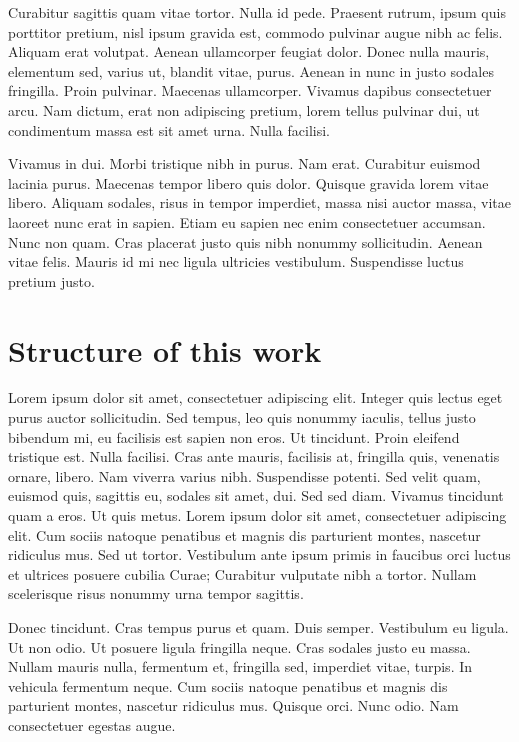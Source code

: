 Curabitur sagittis quam vitae tortor. Nulla id pede. Praesent rutrum, ipsum quis porttitor pretium, nisl ipsum gravida est, commodo pulvinar augue nibh ac felis. Aliquam erat volutpat. Aenean ullamcorper feugiat dolor. Donec nulla mauris, elementum sed, varius ut, blandit vitae, purus. Aenean in nunc in justo sodales fringilla. Proin pulvinar. Maecenas ullamcorper. Vivamus dapibus consectetuer arcu. Nam dictum, erat non adipiscing pretium, lorem tellus pulvinar dui, ut condimentum massa est sit amet urna. Nulla facilisi.

Vivamus in dui. Morbi tristique nibh in purus. Nam erat. Curabitur euismod lacinia purus. Maecenas tempor libero quis dolor. Quisque gravida lorem vitae libero. Aliquam sodales, risus in tempor imperdiet, massa nisi auctor massa, vitae laoreet nunc erat in sapien. Etiam eu sapien nec enim consectetuer accumsan. Nunc non quam. Cras placerat justo quis nibh nonummy sollicitudin. Aenean vitae felis. Mauris id mi nec ligula ultricies vestibulum. Suspendisse luctus pretium justo. 

\section{Structure of this work} 
Lorem ipsum dolor sit amet, consectetuer adipiscing elit. Integer quis lectus eget purus auctor sollicitudin. Sed tempus, leo quis nonummy iaculis, tellus justo bibendum mi, eu facilisis est sapien non eros. Ut tincidunt. Proin eleifend tristique est. Nulla facilisi. Cras ante mauris, facilisis at, fringilla quis, venenatis ornare, libero. Nam viverra varius nibh. Suspendisse potenti. Sed velit quam, euismod quis, sagittis eu, sodales sit amet, dui. Sed sed diam. Vivamus tincidunt quam a eros. Ut quis metus. Lorem ipsum dolor sit amet, consectetuer adipiscing elit. Cum sociis natoque penatibus et magnis dis parturient montes, nascetur ridiculus mus. Sed ut tortor. Vestibulum ante ipsum primis in faucibus orci luctus et ultrices posuere cubilia Curae; Curabitur vulputate nibh a tortor. Nullam scelerisque risus nonummy urna tempor sagittis.

Donec tincidunt. Cras tempus purus et quam. Duis semper. Vestibulum eu ligula. Ut non odio. Ut posuere ligula fringilla neque. Cras sodales justo eu massa. Nullam mauris nulla, fermentum et, fringilla sed, imperdiet vitae, turpis. In vehicula fermentum neque. Cum sociis natoque penatibus et magnis dis parturient montes, nascetur ridiculus mus. Quisque orci. Nunc odio. Nam consectetuer egestas augue.

